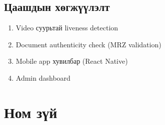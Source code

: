 \documentclass[12pt,a4paper]{article}
\begin{document}
\subsection{Цаашдын хөгжүүлэлт}

\begin{enumerate}[leftmargin=1.2cm]
  \item Video суурьтай liveness detection
  \item Document authenticity check (MRZ validation)
  \item Mobile app хувилбар (React Native)
  \item Admin dashboard
\end{enumerate}

\newpage
\section*{Ном зүй}
\end{document}
